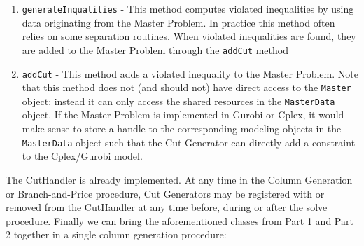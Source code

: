 \documentclass[a4paper]{article}
\newcommand{\code}[1]{\lstinline[language=java, style=seminar]!#1!}
\begin{document}
\begin{enumerate}
 \item \code{generateInqualities} - This method computes violated inequalities by using data originating from the Master Problem. In practice this method often relies on some separation routines. When violated inequalities are found, they are added to the Master Problem through the \code{addCut} method
 \item \code{addCut} - This method adds a violated inequality to the Master Problem. Note that this method does not (and should not) have direct access to the \code{Master} object; instead it can only access the shared resources in the \code{MasterData} object. If the Master Problem is implemented in Gurobi or Cplex, it would make sense to store a handle to the corresponding modeling objects in the \code{MasterData} object such that the Cut Generator can directly add a constraint to the Cplex/Gurobi model.
\end{enumerate}
The CutHandler is already implemented. At any time in the Column Generation or Branch-and-Price procedure, Cut Generators may be registered with or removed from the CutHandler at any time before, during or after the solve procedure. Finally we can bring the aforementioned classes from Part 1 and Part 2 together in a single column generation procedure:
\end{document}
